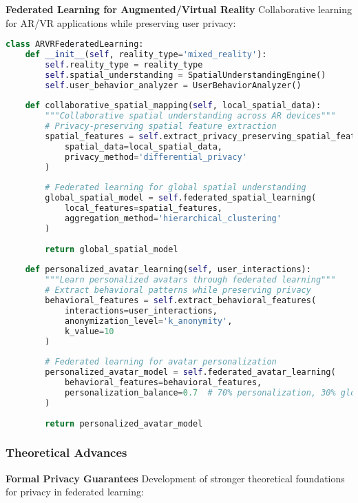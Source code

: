 \textbf{Federated Learning for Augmented/Virtual Reality}
Collaborative learning for AR/VR applications while preserving user privacy:

\begin{lstlisting}[language=python, caption=AR/VR Federated Learning]
class ARVRFederatedLearning:
    def __init__(self, reality_type='mixed_reality'):
        self.reality_type = reality_type
        self.spatial_understanding = SpatialUnderstandingEngine()
        self.user_behavior_analyzer = UserBehaviorAnalyzer()
        
    def collaborative_spatial_mapping(self, local_spatial_data):
        """Collaborative spatial understanding across AR devices"""
        # Privacy-preserving spatial feature extraction
        spatial_features = self.extract_privacy_preserving_spatial_features(
            spatial_data=local_spatial_data,
            privacy_method='differential_privacy'
        )
        
        # Federated learning for global spatial understanding
        global_spatial_model = self.federated_spatial_learning(
            local_features=spatial_features,
            aggregation_method='hierarchical_clustering'
        )
        
        return global_spatial_model
        
    def personalized_avatar_learning(self, user_interactions):
        """Learn personalized avatars through federated learning"""
        # Extract behavioral patterns while preserving privacy
        behavioral_features = self.extract_behavioral_features(
            interactions=user_interactions,
            anonymization_level='k_anonymity',
            k_value=10
        )
        
        # Federated learning for avatar personalization
        personalized_avatar_model = self.federated_avatar_learning(
            behavioral_features=behavioral_features,
            personalization_balance=0.7  # 70% personalization, 30% global
        )
        
        return personalized_avatar_model
\end{lstlisting}

\subsubsection{Theoretical Advances}

\textbf{Formal Privacy Guarantees}
Development of stronger theoretical foundations for privacy in federated learning:

